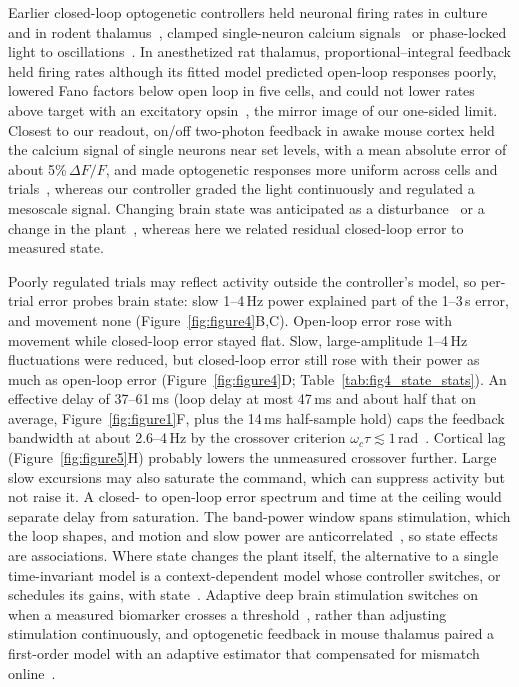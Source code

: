 Earlier closed-loop optogenetic controllers held neuronal firing rates in culture and in rodent thalamus~\citep{newman2015optogenetic,bolus2018design,bolus2021state}, clamped single-neuron calcium signals~\citep{Zhang2018} or phase-locked light to oscillations~\citep{nicholson2018analogue,kanta2019closed,Zaaimi2022}.
In anesthetized rat thalamus, proportional--integral feedback held firing rates although its fitted model predicted open-loop responses poorly, lowered Fano factors below open loop in five cells, and could not lower rates above target with an excitatory opsin~\citep{bolus2018design}, the mirror image of our one-sided limit. Closest to our readout, on/off two-photon feedback in awake mouse cortex held the calcium signal of single neurons near set levels, with a mean absolute error of about 5\%\,$\Delta F/F$, and made optogenetic responses more uniform across cells and trials~\citep{Zhang2018}, whereas our controller graded the light continuously and regulated a mesoscale signal.
Changing brain state was anticipated as a disturbance~\citep{bolus2021state} or a change in the plant~\citep{grosenick2015closed}, whereas here we related residual closed-loop error to measured state.

Poorly regulated trials may reflect activity outside the controller's model, so per-trial error probes brain state: slow 1--4\,Hz power explained part of the 1--3\,s error, and movement none (Figure~\ref{fig:figure4}B,C).
Open-loop error rose with movement while closed-loop error stayed flat.
Slow, large-amplitude 1--4\,Hz fluctuations were reduced, but closed-loop error still rose with their power as much as open-loop error (Figure~\ref{fig:figure4}D; Table~\ref{tab:fig4_state_stats}).
An effective delay of 37--61\,ms (loop delay at most 47\,ms and about half that on average, Figure~\ref{fig:figure1}F, plus the 14\,ms half-sample hold) caps the feedback bandwidth at about 2.6--4\,Hz by the crossover criterion $\omega_c\tau \lesssim 1$\,rad~\citep{skogestad2005multivariable}.
Cortical lag (Figure~\ref{fig:figure5}H) probably lowers the unmeasured crossover further.
Large slow excursions may also saturate the command, which can suppress activity but not raise it.
A closed- to open-loop error spectrum and time at the ceiling would separate delay from saturation.
The band-power window spans stimulation, which the loop shapes, and motion and slow power are anticorrelated~\citep{McGinley2015waking}, so state effects are associations.
Where state changes the plant itself, the alternative to a single time-invariant model is a context-dependent model whose controller switches, or schedules its gains, with state~\citep{rugh2000research,grosenick2015closed}.
Adaptive deep brain stimulation switches on when a measured biomarker crosses a threshold~\citep{little2013adaptive}, rather than adjusting stimulation continuously, and optogenetic feedback in mouse thalamus paired a first-order model with an adaptive estimator that compensated for mismatch online~\citep{bolus2021state}.

